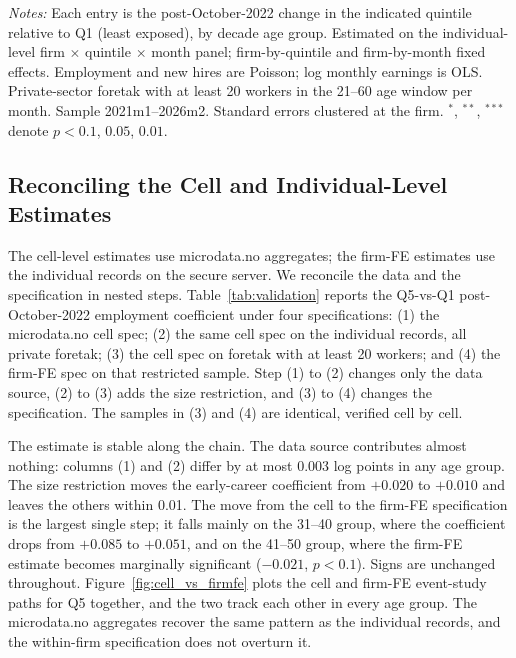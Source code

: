 \documentclass[12pt]{article}
\begin{document}
\begin{table}[tp]
  \centering
  \caption{Within-firm difference-in-differences by AI-exposure quintile, private sector.}
  \label{tab:did_firmfe}
  
  \begin{minipage}{\textwidth}\footnotesize\textit{Notes:} Each entry is the post-October-2022 change in the indicated quintile relative to Q1 (least exposed), by decade age group. Estimated on the individual-level firm $\times$ quintile $\times$ month panel; firm-by-quintile and firm-by-month fixed effects. Employment and new hires are Poisson; log monthly earnings is OLS. Private-sector foretak with at least 20 workers in the 21--60 age window per month. Sample 2021m1--2026m2. Standard errors clustered at the firm. $^{*}$, $^{**}$, $^{***}$ denote $p<0.1$, $0.05$, $0.01$.\end{minipage}
\end{table}


\subsection{Reconciling the Cell and Individual-Level Estimates}\label{sec:results:reconcile}

The cell-level estimates use microdata.no aggregates; the firm-FE estimates use the individual records on the secure server. We reconcile the data and the specification in nested steps. Table~\ref{tab:validation} reports the Q5-vs-Q1 post-October-2022 employment coefficient under four specifications: (1) the microdata.no cell spec; (2) the same cell spec on the individual records, all private foretak; (3) the cell spec on foretak with at least 20 workers; and (4) the firm-FE spec on that restricted sample. Step (1) to (2) changes only the data source, (2) to (3) adds the size restriction, and (3) to (4) changes the specification. The samples in (3) and (4) are identical, verified cell by cell.

The estimate is stable along the chain. The data source contributes almost nothing: columns (1) and (2) differ by at most 0.003 log points in any age group. The size restriction moves the early-career coefficient from $+0.020$ to $+0.010$ and leaves the others within 0.01. The move from the cell to the firm-FE specification is the largest single step; it falls mainly on the 31--40 group, where the coefficient drops from $+0.085$ to $+0.051$, and on the 41--50 group, where the firm-FE estimate becomes marginally significant ($-0.021$, $p<0.1$). Signs are unchanged throughout. Figure~\ref{fig:cell_vs_firmfe} plots the cell and firm-FE event-study paths for Q5 together, and the two track each other in every age group. The microdata.no aggregates recover the same pattern as the individual records, and the within-firm specification does not overturn it.
\end{document}
